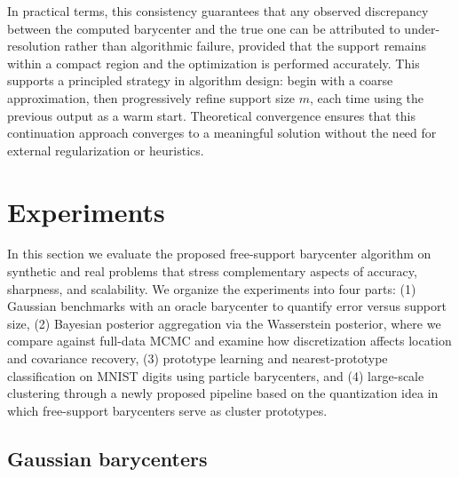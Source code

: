 \documentclass[11pt]{article}
\begin{document}
In practical terms, this consistency guarantees that any observed discrepancy between the computed barycenter and the true one can be attributed to under-resolution rather than algorithmic failure, provided that the support remains within a compact region and the optimization is performed accurately. This supports a principled strategy in algorithm design: begin with a coarse approximation, then progressively refine support size $m$, each time using the previous output as a warm start. Theoretical convergence ensures that this continuation approach converges to a meaningful solution without the need for external regularization or heuristics.

























\section{Experiments}\label{sec:chp5-experiment}

In this section we evaluate the proposed free-support barycenter algorithm on synthetic and real problems that stress complementary aspects of accuracy, sharpness, and scalability. We organize the experiments into four parts: (1) Gaussian benchmarks with an oracle barycenter to quantify error versus support size,  (2) Bayesian posterior aggregation via the Wasserstein posterior, where we compare against full-data MCMC and examine how discretization affects location and covariance recovery, (3) prototype learning and nearest-prototype classification on MNIST digits using particle barycenters,  and (4) large-scale clustering through a newly proposed pipeline based on the quantization idea in which free-support barycenters serve as cluster prototypes. 


\subsection{Gaussian barycenters}
\end{document}
